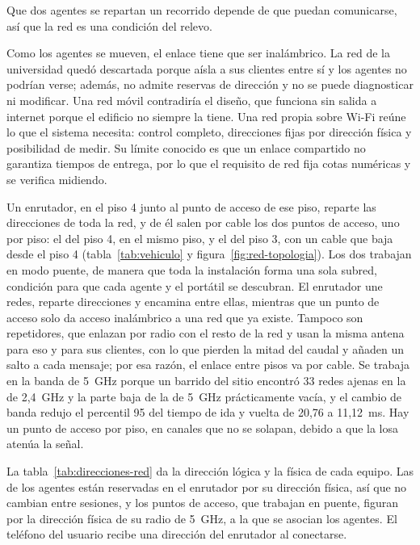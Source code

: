 Que dos agentes se repartan un recorrido depende de que puedan comunicarse, así que la red es una condición del relevo.

Como los agentes se mueven, el enlace tiene que ser inalámbrico. La red de la universidad quedó descartada porque aísla a sus clientes entre sí y los agentes no podrían verse; además, no
admite reservas de dirección y no se puede diagnosticar ni modificar. Una red móvil contradiría el diseño, que funciona sin salida a internet porque el edificio no siempre la tiene. Una red
propia sobre Wi-Fi reúne lo que el sistema necesita: control completo, direcciones fijas por dirección física y posibilidad de medir. Su límite conocido es que un enlace compartido no garantiza
tiempos de entrega, por lo que el requisito de red fija cotas numéricas y se verifica midiendo.

Un enrutador, en el piso 4 junto al punto de acceso de ese piso, reparte las direcciones de toda la red, y de él salen por cable los dos puntos de acceso, uno por piso: el del piso 4, en el mismo piso, y el del piso 3, con un cable que baja desde el piso 4 (tabla~\ref{tab:vehiculo} y figura~\ref{fig:red-topologia}). Los dos trabajan en modo puente, de manera que toda la instalación forma una sola subred, condición para que cada agente y el portátil se descubran. El enrutador une redes, reparte direcciones y encamina entre ellas, mientras que un
punto de acceso solo da acceso inalámbrico a una red que ya existe. Tampoco son repetidores, que enlazan por radio con el resto de la red y usan la misma antena para eso y para sus clientes, con lo que
pierden la mitad del caudal y añaden un salto a cada mensaje; por esa razón, el enlace entre pisos va por cable. Se trabaja en la banda de 5~GHz porque un barrido del sitio encontró 33 redes ajenas en
la de 2,4~GHz y la parte baja de la de 5~GHz prácticamente vacía, y el cambio de banda redujo el percentil 95 del tiempo de ida y vuelta de 20,76 a 11,12~ms. Hay un punto de acceso por piso, en canales
que no se solapan, debido a que la losa atenúa la señal.

La tabla~\ref{tab:direcciones-red} da la dirección lógica y la física de cada equipo. Las de los agentes están reservadas en el
enrutador por su dirección física, así que no cambian entre sesiones, y los puntos de acceso, que trabajan en puente, figuran por la
dirección física de su radio de 5~GHz, a la que se asocian los agentes. El teléfono del usuario recibe una dirección del enrutador al
conectarse.

